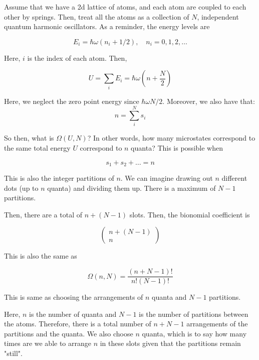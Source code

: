 \documentclass{article}
\newtheorem{one minute paper}[theorem]{One Minute Paper}
\begin{document}
Assume that we have a 2d lattice of atoms, and each atom are coupled to each other by springs. Then, treat all the atoms as a collection of $N$, independent quantum harmonic oscillators. As a reminder, the energy levels are 

\begin{equation}
    E_i = \hbar \omega (n_i + 1/2), \quad n_i = 0,1,2,\dots
\end{equation}

Here, $i$ is the index of each atom. Then, 

\begin{equation}
    U = \sum_i E_i = \hbar \omega (n + \frac{N}{2})
\end{equation}

Here, we neglect the zero point energy since $\hbar \omega N/2$. 
Moreover, we also have that: $$n = \sum_i^N s_i$$

So then, what is $\Omega(U, N)$? In other words, how many microstates correspond to the same total energy $U$ correspond to $n$ quanta? This is possible when

\begin{equation}
    s_1 + s_2 + \dots = n
\end{equation}

This is also the integer partitions of $n$. We can imagine drawing out $n$ different dots (up to $n$ quanta) and dividing them up. There is a maximum of $N-1$ partitions. 

Then, there are a total of $n + (N-1)$ slots. Then, the bionomial coefficient is 

\begin{equation}
    \begin{pmatrix}
        n + (N-1) \\
        n
    \end{pmatrix}
\end{equation}

This is also the same as 

\begin{equation}
    \Omega(n,N) = \frac{(n + N -1)!}{n!(N-1)!}
\end{equation}

This is same as choosing the arrangements of $n$ quanta and $N-1$ partitions. 

Here, $n$ is the number of quanta and $N-1$ is the number of partitions between the atoms. Therefore, there is a total number of $n + N-1$ arrangements of the partitions and the quanta. We also choose $n$ quanta, which is to say how many times 
are we able to arrange $n$ in these slots given that the partitions remain "still". 
\end{document}
